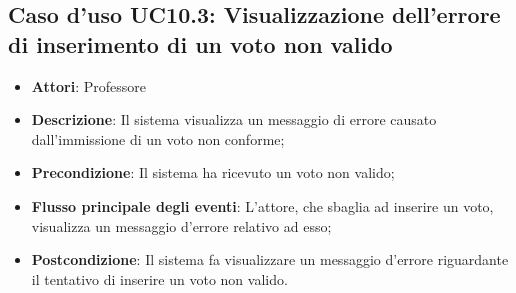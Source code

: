 \subsection{Caso d'uso \texorpdfstring{UC10.3}{UC10.3}: Visualizzazione dell'errore di inserimento di un voto non valido}
\begin{itemize}
\item \textbf{Attori}: Professore
\item \textbf{Descrizione}: Il sistema visualizza un messaggio di errore causato dall'immissione di un voto non conforme;
\item \textbf{Precondizione}: Il sistema ha ricevuto un voto non valido;

\item \textbf{Flusso principale degli eventi}: L'attore, che sbaglia ad inserire un voto, visualizza un messaggio d'errore relativo ad esso;
\item \textbf{Postcondizione}: Il sistema fa visualizzare un messaggio d'errore riguardante il tentativo di inserire un voto non valido.
\end{itemize}
